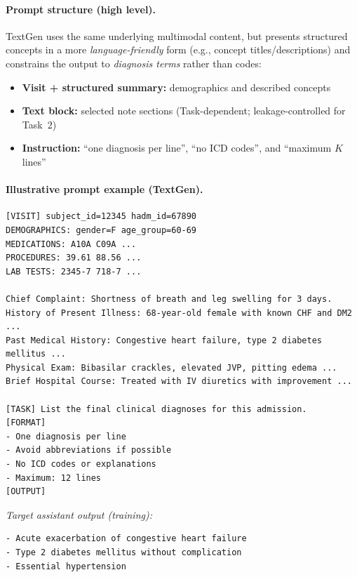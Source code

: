 \paragraph{Prompt structure (high level).}
TextGen uses the same underlying multimodal content, but presents structured concepts in a more \emph{language-friendly} form (e.g., concept titles/descriptions) and constrains the output to \emph{diagnosis terms} rather than codes:
\begin{itemize}
    \item \textbf{Visit + structured summary:} demographics and described concepts
    \item \textbf{Text block:} selected note sections (Task-dependent; leakage-controlled for Task~2)
    \item \textbf{Instruction:} ``one diagnosis per line'', ``no ICD codes'', and ``maximum $K$ lines''
\end{itemize}

\paragraph{Illustrative prompt example (TextGen).}
\begin{tcolorbox}[title={Example Textgen user prompt},colback=gray!3,colframe=black!30,breakable]
\small
\begin{verbatim}
[VISIT] subject_id=12345 hadm_id=67890
DEMOGRAPHICS: gender=F age_group=60-69
MEDICATIONS: A10A C09A ...
PROCEDURES: 39.61 88.56 ...
LAB TESTS: 2345-7 718-7 ...

Chief Complaint: Shortness of breath and leg swelling for 3 days.
History of Present Illness: 68-year-old female with known CHF and DM2 ...
Past Medical History: Congestive heart failure, type 2 diabetes mellitus ...
Physical Exam: Bibasilar crackles, elevated JVP, pitting edema ...
Brief Hospital Course: Treated with IV diuretics with improvement ...

[TASK] List the final clinical diagnoses for this admission.
[FORMAT]
- One diagnosis per line
- Avoid abbreviations if possible
- No ICD codes or explanations
- Maximum: 12 lines
[OUTPUT]
\end{verbatim}

\vspace{1mm}
\textit{Target assistant output (training):}
\begin{verbatim}
- Acute exacerbation of congestive heart failure
- Type 2 diabetes mellitus without complication
- Essential hypertension
\end{verbatim}
\end{tcolorbox}

